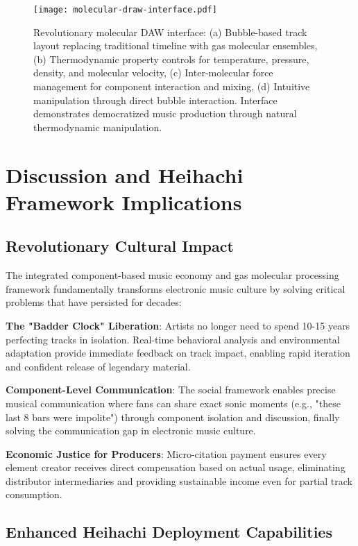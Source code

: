 \documentclass[12pt,a4paper]{article}
\begin{document}
\begin{figure}[h]
\centering
\texttt{[image: molecular-draw-interface.pdf]}
\caption{Revolutionary molecular DAW interface: (a) Bubble-based track layout replacing traditional timeline with gas molecular ensembles, (b) Thermodynamic property controls for temperature, pressure, density, and molecular velocity, (c) Inter-molecular force management for component interaction and mixing, (d) Intuitive manipulation through direct bubble interaction. Interface demonstrates democratized music production through natural thermodynamic manipulation.}
\label{fig:molecular-draw-interface}
\end{figure}

\section{Discussion and Heihachi Framework Implications}

\subsection{Revolutionary Cultural Impact}

The integrated component-based music economy and gas molecular processing framework fundamentally transforms electronic music culture by solving critical problems that have persisted for decades:

\textbf{The "Badder Clock" Liberation}: Artists no longer need to spend 10-15 years perfecting tracks in isolation. Real-time behavioral analysis and environmental adaptation provide immediate feedback on track impact, enabling rapid iteration and confident release of legendary material.

\textbf{Component-Level Communication}: The social framework enables precise musical communication where fans can share exact sonic moments (e.g., "these last 8 bars were impolite") through component isolation and discussion, finally solving the communication gap in electronic music culture.

\textbf{Economic Justice for Producers}: Micro-citation payment ensures every element creator receives direct compensation based on actual usage, eliminating distributor intermediaries and providing sustainable income even for partial track consumption.

\subsection{Enhanced Heihachi Deployment Capabilities}
\end{document}

